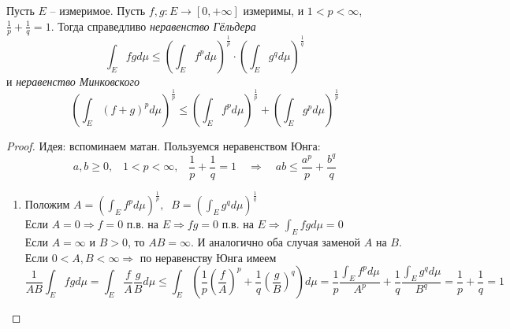 \begin{theorem}\label{thmGeldMink}
	Пусть $E$ -- измеримое. Пусть $f, g: E \to [0, +\infty]$ измеримы, и $1 < p < \infty$, $\frac{1}{p} + \frac{1}{q} = 1$. Тогда справедливо \textit{неравенство Гёльдера} 
 \[\int_Efgd\mu \leqslant \left(\int_Ef^pd\mu\right)^{\frac 1p} \cdot \left(\int_Eg^qd\mu\right)^{\frac 1q}\]
и \textit{неравенство Минковского}
 \[\left(\int_E(f + g)^pd\mu\right)^{\frac 1p} \leqslant \left(\int_Ef^pd\mu\right)^{\frac 1p} + \left(\int_Eg^pd\mu\right)^{\frac 1p}\]
\end{theorem}

\begin{proof}
	Идея: вспоминаем матан. Пользуемся неравенством Юнга: 
 $$a,b \geqslant 0, \;\;\; 1 < p < \infty, \;\;\; \frac{1}{p} + \frac{1}{q} = 1 \quad \Rightarrow \quad ab \leqslant \frac{a^p}{p} + \frac{b^q}{q}$$

\begin{enumerate}
    \item Положим $A = \left(\int_Ef^pd\mu\right)^{\frac 1p}, \;\; B= \left(\int_Eg^qd\mu\right)^{\frac 1q}$ \\
    Если $A = 0 \Rightarrow f = 0$ п.в. на $E \Rightarrow fg = 0$ п.в. на $E \Rightarrow \int_Efgd\mu = 0$  \\
    Если $A = \infty$ и $ B > 0 $, то $ AB = \infty$. И аналогично оба случая заменой $A$ на $B$.\\
    Если $0 < A, B < \infty \Rightarrow $ по неравенству Юнга имеем
 \[\frac{1}{AB}\int_Efgd\mu  = \int_E\frac{f}{A}\frac{g}{B}d\mu 
 \leqslant \int_E\left(\frac{1}{p}\left(\frac{f}{A}\right)^p + \frac{1}{q}\left(\frac{g}{B}\right)^q\right)d\mu = \frac{1}{p}\frac{\int_Ef^pd\mu}{A^p} + \frac{1}{q}\frac{\int_Eg^qd\mu}{B^q} = \frac{1}{p} + \frac{1}{q} = 1\]


\end{enumerate}
\end{proof}
